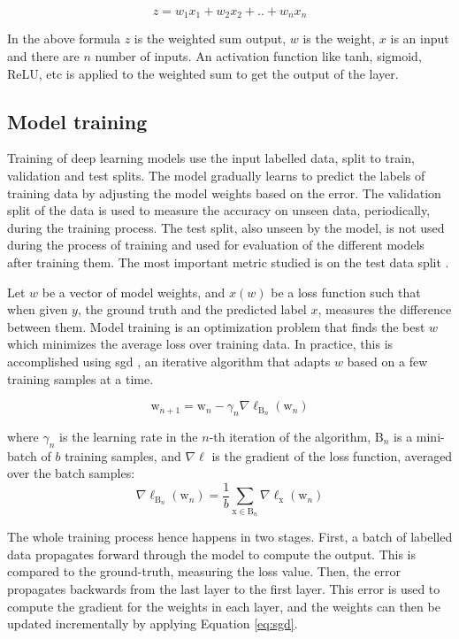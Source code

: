 \[ z = w_1x_1 + w_2x_2 + .. + w_nx_n \]

In the above formula $z$ is the weighted sum output, $w$ is the weight, $x$ is an input and there are $n$ number of inputs. An activation function like tanh, sigmoid, ReLU, etc is applied to the weighted sum to get the output of the layer. 

\subsection{Model training}
Training of deep learning models use the input labelled data, split to train, validation and test splits. The model gradually learns to predict the labels of training data by adjusting the model weights based on the error. The validation split of the data is used to measure the accuracy on unseen data, periodically, during the training process. The test split, also unseen by the model, is not used during the process of training and used for evaluation of the different models after training them. The
most important metric studied is on the test data split \cite{Koliousis2019CROSSBOW:Servers}.

Let $w$ be a vector of model weights, and $x (w)$ be a loss function such that when given $y$, the ground truth and the predicted label $x$, measures the difference between them. Model training is an optimization problem that finds the best $w$ which minimizes the average loss over training data. In practice, this is accomplished using
\acrfull{sgd} \cite{Robbins1951AMethod}, an iterative algorithm that adapts $w$ based on a few training samples at a time.

\begin{equation}
\label{eq:sgd}
\mathrm{w}_{n+1}=\mathrm{w}_{n}-\gamma_{n} \nabla \ell_{\mathrm{B}_{n}}\left(\mathrm{w}_{n}\right)
\end{equation}

where $\gamma_{n}$ is the learning rate in the $n$-th iteration of the algorithm, $\mathrm{B}_{n}$ is a mini-batch of $b$ training samples, and $\nabla \ell$ is the gradient of the loss function, averaged over the batch samples:
$$
\nabla \ell_{\mathrm{B}_{n}}\left(\mathrm{w}_{n}\right)=\frac{1}{b} \sum_{\mathrm{x} \in \mathrm{B}_{n}} \nabla \ell_{\mathrm{x}}\left(\mathrm{w}_{n}\right)
$$

The whole training process hence happens in two stages. First, a batch of labelled data propagates forward through the model to compute the output. This is compared to the ground-truth, measuring the loss value. Then, the error propagates backwards from the last layer to the first layer. This error is used to compute the gradient for the weights in each layer, and the weights can then be updated incrementally by applying Equation \ref{eq:sgd}.

